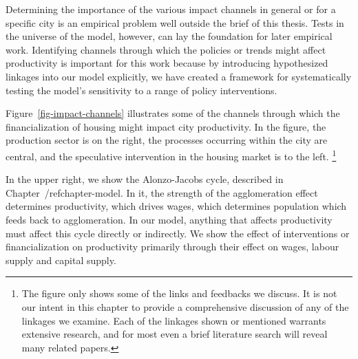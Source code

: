 Determining the importance of the various impact channels in general or for a specific city is an empirical problem well outside the brief of this thesis. Tests in the universe of the model, however, can lay the foundation for later empirical work. Identifying channels through which the policies or trends might affect productivity is important for this work because by introducing hypothesized linkages into our model explicitly, we have created a framework for systematically testing the model's sensitivity to a range of policy interventions. 

Figure~\ref{fig-impact-channels} illustrates some of the channels through which the financialization of housing might impact city productivity. 
In the figure, the production sector is on the right, the processes occurring within the city are central, and the speculative intervention in the housing market is to the left.  \footnote{The figure only shows some of the links and feedbacks we discuss. It is not our intent in this chapter to provide  a comprehensive discussion of any of the linkages we examine. Each of the linkages shown or mentioned warrants extensive research, and for most even a brief literature search will reveal many related papers.} 


In the upper right, we show the \gls{Alonzo-Jacobs cycle}, described in Chapter~/ref{chapter-model}. In it, the strength of the agglomeration effect determines productivity, which drives wages, which determines population which feeds back to agglomeration. In our model, anything that affects productivity must affect this cycle directly or indirectly.  We show the effect of interventions or financialization on productivity primarily through their effect on wages, labour supply and capital supply. %



